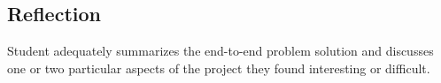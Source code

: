 \subsection{Reflection}
Student adequately summarizes the end-to-end problem solution and discusses one or two particular aspects of the project they found interesting or difficult.
